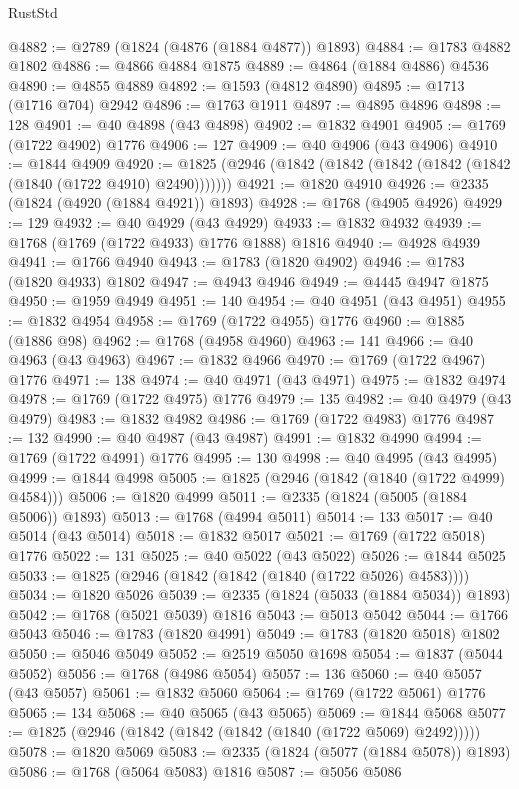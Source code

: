 \begin{lexlean}{RustStd}
\begin{coremodule}
@4882 := @2789 (@1824 (@4876 (@1884 @4877)) @1893)
@4884 := @1783 @4882 @1802
@4886 := @4866 @4884 @1875
@4889 := @4864 (@1884 @4886) @4536
@4890 := @4855 @4889
@4892 := @1593 (@4812 @4890)
@4895 := @1713 (@1716 @704) @2942
@4896 := @1763 @1911
@4897 := @4895 @4896
@4898 := 128
@4901 := @40 @4898 (@43 @4898)
@4902 := @1832 @4901
@4905 := @1769 (@1722 @4902) @1776
@4906 := 127
@4909 := @40 @4906 (@43 @4906)
@4910 := @1844 @4909
@4920 := @1825 (@2946 (@1842 (@1842 (@1842 (@1842 (@1842 (@1840 (@1722 @4910) @2490)))))))
@4921 := @1820 @4910
@4926 := @2335 (@1824 (@4920 (@1884 @4921)) @1893)
@4928 := @1768 (@4905 @4926)
@4929 := 129
@4932 := @40 @4929 (@43 @4929)
@4933 := @1832 @4932
@4939 := @1768 (@1769 (@1722 @4933) @1776 @1888) @1816
@4940 := @4928 @4939
@4941 := @1766 @4940
@4943 := @1783 (@1820 @4902)
@4946 := @1783 (@1820 @4933) @1802
@4947 := @4943 @4946
@4949 := @4445 @4947 @1875
@4950 := @1959 @4949
@4951 := 140
@4954 := @40 @4951 (@43 @4951)
@4955 := @1832 @4954
@4958 := @1769 (@1722 @4955) @1776
@4960 := @1885 (@1886 @98)
@4962 := @1768 (@4958 @4960)
@4963 := 141
@4966 := @40 @4963 (@43 @4963)
@4967 := @1832 @4966
@4970 := @1769 (@1722 @4967) @1776
@4971 := 138
@4974 := @40 @4971 (@43 @4971)
@4975 := @1832 @4974
@4978 := @1769 (@1722 @4975) @1776
@4979 := 135
@4982 := @40 @4979 (@43 @4979)
@4983 := @1832 @4982
@4986 := @1769 (@1722 @4983) @1776
@4987 := 132
@4990 := @40 @4987 (@43 @4987)
@4991 := @1832 @4990
@4994 := @1769 (@1722 @4991) @1776
@4995 := 130
@4998 := @40 @4995 (@43 @4995)
@4999 := @1844 @4998
@5005 := @1825 (@2946 (@1842 (@1840 (@1722 @4999) @4584)))
@5006 := @1820 @4999
@5011 := @2335 (@1824 (@5005 (@1884 @5006)) @1893)
@5013 := @1768 (@4994 @5011)
@5014 := 133
@5017 := @40 @5014 (@43 @5014)
@5018 := @1832 @5017
@5021 := @1769 (@1722 @5018) @1776
@5022 := 131
@5025 := @40 @5022 (@43 @5022)
@5026 := @1844 @5025
@5033 := @1825 (@2946 (@1842 (@1842 (@1840 (@1722 @5026) @4583))))
@5034 := @1820 @5026
@5039 := @2335 (@1824 (@5033 (@1884 @5034)) @1893)
@5042 := @1768 (@5021 @5039) @1816
@5043 := @5013 @5042
@5044 := @1766 @5043
@5046 := @1783 (@1820 @4991)
@5049 := @1783 (@1820 @5018) @1802
@5050 := @5046 @5049
@5052 := @2519 @5050 @1698
@5054 := @1837 (@5044 @5052)
@5056 := @1768 (@4986 @5054)
@5057 := 136
@5060 := @40 @5057 (@43 @5057)
@5061 := @1832 @5060
@5064 := @1769 (@1722 @5061) @1776
@5065 := 134
@5068 := @40 @5065 (@43 @5065)
@5069 := @1844 @5068
@5077 := @1825 (@2946 (@1842 (@1842 (@1842 (@1840 (@1722 @5069) @2492)))))
@5078 := @1820 @5069
@5083 := @2335 (@1824 (@5077 (@1884 @5078)) @1893)
@5086 := @1768 (@5064 @5083) @1816
@5087 := @5056 @5086

\end{coremodule}
\end{lexlean}
